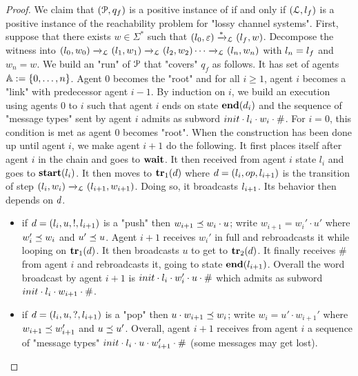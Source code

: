 \begin{proof}
	We claim that $(\mathcal{P}, q_f)$ is a positive instance of \COVER if and only if $(\mathcal{L}, l_f)$ is a positive instance of the reachability problem for "lossy channel systems".
	First, suppose that there exists $w \in \Sigma^*$ such that $(l_0, \varepsilon) \xrightarrow{*}_{\mathcal{L}} (l_f, w)$. Decompose the witness into $(l_0, w_0) \xrightarrow{}_{\mathcal{L}} (l_1, w_1) \xrightarrow{}_{\mathcal{L}} (l_2, w_2) \cdots \xrightarrow{}_{\mathcal{L}} (l_n,w_n)$ with $l_n = l_f$ and $w_n =w$. 
	We build an "run" of $\mathcal{P}$ that "covers" $q_f$ as follows. It has set of agents $\mathbb{A} := \{0,\dots, n\}$. Agent $0$ becomes the "root" and for all $i \geq 1$, agent $i$ becomes a "link" with predecessor agent $i-1$. By induction on $i$, we build an execution using agents $0$ to $i$ such that agent $i$ ends on state $\mathbf{end}(d_i)$ and the sequence of "message types" sent by agent $i$ admits as subword $\mathsf{init} \cdot \mathsf{\lstate_i} \cdot w_i \cdot \mathsf{\#}$. For $i=0$, this condition is met as agent $0$ becomes "root". When the construction has been done up until agent $i$, we make agent $i+1$ do the following. It first places itself after agent $i$ in the chain and goes to $\mathbf{wait}$. It then received from agent $i$ state $l_i$ and goes to $\mathbf{start}(l_i)$. It then moves to $\mathbf{tr}_1(d)$ where $\ltrans = (\lstate_i, \op, \lstate_{i+1})$ is the transition of step $(l_i, w_i) \xrightarrow{}_{\mathcal{L}} (l_{i+1}, w_{i+1})$. Doing so, it broadcasts $\mathsf{\lstate_{i+1}}$. Its behavior then depends on $d$.
	\begin{itemize}
		\item if $d =(l_i, u,!, l_{i+1})$ is a "push" then $w_{i+1} \preceq w_i \cdot u$; write $w_{i+1} = w_{i}' \cdot u'$ where $w_i' \preceq w_i$ and $u' \preceq u$. Agent $i+1$ receives $w_i'$ in full and rebroadcasts it while looping on $\mathbf{tr}_1(d)$. It then broadcasts $u$ to get to $\mathbf{tr}_2(d)$. It finally receives $\mathsf{\#}$ from agent $i$ and rebroadcasts it, going to state $\mathbf{end}(l_{i+1})$. Overall the word broadcast by agent $i+1$ is $\mathsf{init} \cdot \mathsf{\lstate_i} \cdot w'_i \cdot u \cdot \mathsf{\#}$ which admits as subword $\mathsf{init} \cdot \mathsf{\lstate_i} \cdot w_{i+1} \cdot \mathsf{\#}$.
		\item if $d =(l_i, u,?, l_{i+1})$ is a "pop" then $u \cdot w_{i+1} \preceq w_i$; write $w_{i} = u' \cdot w_{i+1}'$ where $w_{i+1} \preceq w_{i+1}'$ and $u \preceq u'$. Overall, agent $i+1$ receives from agent $i$ a sequence of "message types" $\mathsf{init} \cdot \mathsf{\lstate_i} \cdot u \cdot w_{i+1}' \cdot \mathsf{\#}$ (some messages may get lost). 

\end{itemize}
\end{proof}
